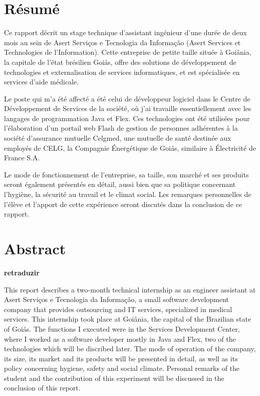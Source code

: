 \chapter*{Résumé}

Ce rapport décrit un stage technique d'assistant ingénieur d'une durée de deux mois au sein de Asert Serviços e Tecnologia da Informação (Asert Services et Technologies de l'Information). Cette entreprise de petite taille située à Goiânia, la capitale de l'état brésilien Goiás, offre des solutions de développement de technologies et externalisation de services informatiques, et est spécialisée en services d'aide médicale. 

Le poste qui m'a été affecté a été celui de développeur logiciel dans le Centre de Développement de Services de la société, où j'ai travaille essentiellement avec les langages de programmation Java et Flex. Ces technologies ont été utilisées pour l'élaboration d'un portail web Flash de gestion de personnes adhérentes à la société d'assurance mutuelle Celgmed, une mutuelle de santé destinée aux employés de CELG, la Compagnie Énergétique de Goiás, similaire à Électricité de France S.A.

Le mode de fonctionnement de l'entreprise, sa taille, son marché et ses produits seront également présentés en détail, aussi bien que sa politique concernant l'hygiène, la sécurité au travail et le climat social. Les remarques personnelles de l'élève et l'apport de cette expérience seront discutés dans la conclusion de ce rapport.


\chapter*{Abstract}

\begin{center}
\bfseries retraduzir
\end{center}

This report describes a two-month technical internship as an engineer assistant at Asert Serviços e Tecnologia da Informação, a small software development company that provides outsourcing and IT services, specialized in medical services. This internship took place at Goiânia, the capital of the Brazilian state of Goiás. The functions I executed were in the Services Development Center, where I worked as a software developer mostly in Java and Flex, two of the technologies which will be discribed later. The mode of operation of the company, its size, its market and its products will be presented in
detail, as well as its policy concerning hygiene, safety and social climate. Personal remarks of the student and the contribution of this experiment will be discussed in the conclusion of this report.
